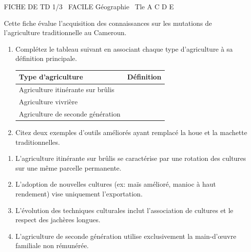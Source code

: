 \documentclass[11pt]{article}
\begin{document}
\begin{tcolorbox}[enhanced,colback=popink,colframe=popink,arc=10pt,boxrule=0pt,left=12pt,right=12pt,top=9pt,bottom=9pt]
{\color{white}\popxbold\small FICHE DE TD 1/3 \textbullet\ FACILE \hfill Géographie \textbullet\ Tle A C D E\par}
\end{tcolorbox}
\vspace{4pt}
Cette fiche évalue l'acquisition des connaissances sur les mutations de l'agriculture traditionnelle au Cameroun.

\begin{exercice}
\begin{enumerate}
    \item Complétez le tableau suivant en associant chaque type d'agriculture à sa définition principale.
    \begin{tabular}{|p{4cm}|p{10cm}|}
    \hline
    \textbf{Type d'agriculture} & \textbf{Définition} \\ \hline
    Agriculture itinérante sur brûlis & \\ \hline
    Agriculture vivrière & \\ \hline
    Agriculture de seconde génération & \\ \hline
    \end{tabular}
    \item Citez deux exemples d'outils améliorés ayant remplacé la houe et la machette traditionnelles.
\end{enumerate}
\end{exercice}

\begin{exercice}
\begin{enumerate}
    \item L'agriculture itinérante sur brûlis se caractérise par une rotation des cultures sur une même parcelle permanente.
    \item L'adoption de nouvelles cultures (ex: maïs amélioré, manioc à haut rendement) vise uniquement l'exportation.
    \item L'évolution des techniques culturales inclut l'association de cultures et le respect des jachères longues.
    \item L'agriculture de seconde génération utilise exclusivement la main-d'œuvre familiale non rémunérée.
\end{enumerate}
\end{exercice}
\end{document}
